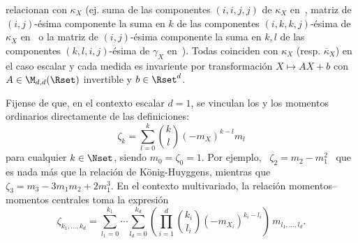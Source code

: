 \begin{itemize}
\begin{enumerate}
{  relacionan  con  $\kappa_X$  (ej.  suma  de  las  componentes  $(i,i,j,j)$  de
  $\kappa_X$ en~\cite{Mar70},  matriz de  $(i,j)$-\'esima componente la  suma en
  $k$ de las componentes  $(i,k,k,j)$-\'esima de $\kappa_X$ en~\cite{MorRho94} o
  la matriz  de $(i,j)$-\'esima componente la  suma en $k,l$  de las componentes
  $(k,l,i,j)$-\'esima  de  $\gamma_X$  en~\cite{Kol08}).   Todas  coinciden  con
  $\kappa_X$ (resp. $\overline{\kappa}_X$)  en el caso escalar y  cada medida es
  invariente   por  transformaci\'on  $X   \mapsto  A   X  +   b$  con   $A  \in
  \M_{d,d}(\Rset)$ invertible y $b \in \Rset^d$.}
  \end{enumerate}
  Fijense  de   que,  en  el  contexto   escalar  $d  =  1$,   se  vinculan  los
    y los  momentos  ordinarios  directamente de  las
  definiciones:
  \[
  \zeta_k = \sum_{l=0}^k \binom{k}{l} \left( - m_X \right)^{k-l} m_l
  \]
  para cualquier  $k \in  \Nset$, siendo $m_0  = \zeta_0  = 1$.  Por  ejemplo, \
  $\zeta_2  =  m_2  -  m_1^2$  \   que  es  nada  m\'as  que  la  relaci\'on  de
  K\"onig-Huyggens, mientras que \ $\zeta_3 = m_3 - 3 m_1 m_2 + 2 m_1^3$.  En el
  contexto  multivariado,  la relaci\'on  momentos--momentos  centrales toma  la
  expresi\'on
  \[
  \zeta_{k_1,\ldots,k_d}  = \sum_{l_1  =  0}^{k_1} \cdots  \sum_{l_d =  0}^{k_d}
  \left(  \prod_{i=1}^d  \binom{k_i}{l_i}  \left(  -  m_{X_i}  \right)^{k_i-l_i}
  \right) \, m_{l_1,\ldots,l_d}.
  \]
\end{itemize}



